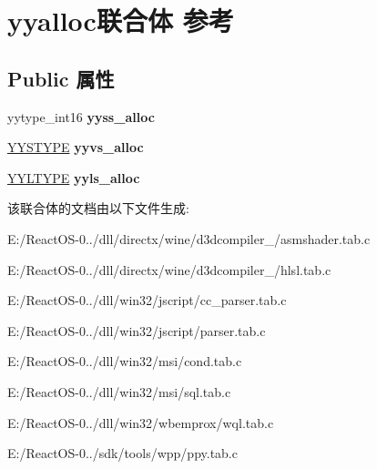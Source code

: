 \hypertarget{unionyyalloc}{}\section{yyalloc联合体 参考}
\label{unionyyalloc}
\subsection*{Public 属性}
\begin{DoxyCompactItemize}
\item 
\mbox{\label{unionyyalloc_a4800e0520a89a4789afa7b5d82197e65}} 
yytype\+\_\+int16 {\bfseries yyss\+\_\+alloc}
\item 
\mbox{\label{unionyyalloc_a9326f4fdc6f737a929444427836d8928}} 
\hyperlink{union_y_y_s_t_y_p_e}{Y\+Y\+S\+T\+Y\+PE} {\bfseries yyvs\+\_\+alloc}
\item 
\mbox{\label{unionyyalloc_a542e43248e6afac9af342c2f4e3162fc}} 
\hyperlink{struct_y_y_l_t_y_p_e}{Y\+Y\+L\+T\+Y\+PE} {\bfseries yyls\+\_\+alloc}
\end{DoxyCompactItemize}


该联合体的文档由以下文件生成\+:\begin{DoxyCompactItemize}
\item 
E\+:/\+React\+O\+S-\/0../dll/directx/wine/d3dcompiler\+\_/asmshader.\+tab.\+c\item 
E\+:/\+React\+O\+S-\/0../dll/directx/wine/d3dcompiler\+\_/hlsl.\+tab.\+c\item 
E\+:/\+React\+O\+S-\/0../dll/win32/jscript/cc\+\_\+parser.\+tab.\+c\item 
E\+:/\+React\+O\+S-\/0../dll/win32/jscript/parser.\+tab.\+c\item 
E\+:/\+React\+O\+S-\/0../dll/win32/msi/cond.\+tab.\+c\item 
E\+:/\+React\+O\+S-\/0../dll/win32/msi/sql.\+tab.\+c\item 
E\+:/\+React\+O\+S-\/0../dll/win32/wbemprox/wql.\+tab.\+c\item 
E\+:/\+React\+O\+S-\/0../sdk/tools/wpp/ppy.\+tab.\+c\end{DoxyCompactItemize}
